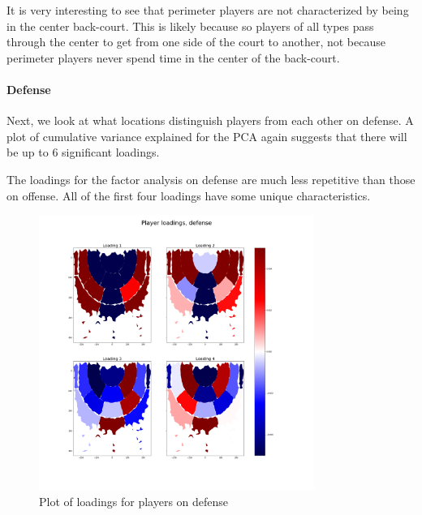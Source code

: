 \documentclass[]{article}
\let\oldparagraph\paragraph
\renewcommand{\paragraph}[1]{\oldparagraph{#1}\mbox{}}
\begin{document}
It is very interesting to see that perimeter players are not
characterized by being in the center back-court. This is likely because
so players of all types pass through the center to get from one side of
the court to another, not because perimeter players never spend time in
the center of the back-court.

\paragraph{Defense}\label{defense}

Next, we look at what locations distinguish players from each other on
defense. A plot of cumulative variance explained for the PCA again
suggests that there will be up to 6 significant loadings.

The loadings for the factor analysis on defense are much less repetitive
than those on offense. All of the first four loadings have some unique
characteristics.

\begin{figure}
\centering
\includegraphics[width=0.80000\textwidth]{first_4_loadings_players_def.png}
\caption{Plot of loadings for players on defense}
\end{figure}
\end{document}
